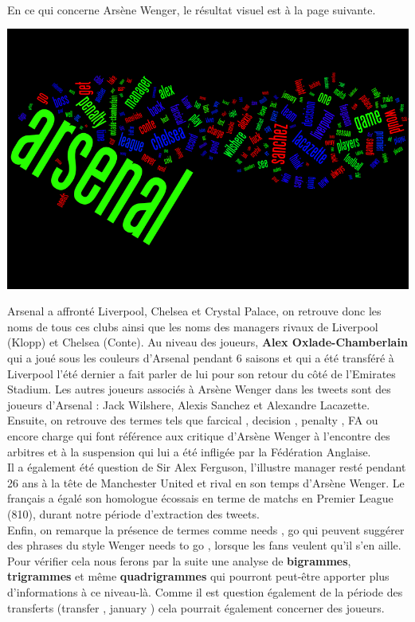 \documentclass[14pt, openany]{article}
\begin{document}
\paragraph{}
En ce qui concerne Arsène Wenger, le résultat visuel est à la page suivante.
\begin{center}
\includegraphics[scale=0.6]{Images/wenger_words.png}
\end{center}
Arsenal a affronté Liverpool, Chelsea et Crystal Palace, on retrouve donc les noms de tous ces clubs ainsi que les noms des managers rivaux de Liverpool (Klopp) et Chelsea (Conte). Au niveau des joueurs, \textbf{Alex Oxlade-Chamberlain} qui a joué sous les couleurs d'Arsenal pendant 6 saisons et qui a été transféré à Liverpool l'été dernier a fait parler de lui pour son retour du côté de l'Emirates Stadium. Les autres joueurs associés à Arsène Wenger dans les tweets sont des joueurs d'Arsenal : Jack Wilshere, Alexis Sanchez et Alexandre Lacazette.\\
Ensuite, on retrouve des termes tels que \og farcical \fg{}, \og decision \fg{}, \og penalty \fg{}, \og FA \fg{} ou encore \og charge \fg{}  qui font référence aux critique d'Arsène Wenger à l'encontre des arbitres et à la suspension qui lui a été infligée par la Fédération Anglaise.\\
Il a également été question de Sir Alex Ferguson, l'illustre manager resté pendant 26 ans à la tête de Manchester United et rival en son temps d'Arsène Wenger. Le français a égalé son homologue écossais en terme de matchs en Premier League (810), durant notre période d'extraction des tweets.\\
Enfin, on remarque la présence de termes comme \og needs \fg{}, \og go \fg{} qui peuvent suggérer des phrases du style \og Wenger needs to go \fg{}, lorsque les fans veulent qu'il s'en aille. Pour vérifier cela nous ferons par la suite une analyse de \textbf{bigrammes}, \textbf{trigrammes} et même \textbf{quadrigrammes} qui pourront peut-être apporter plus d'informations à ce niveau-là. Comme il est question également de la période des transferts (\og transfer \fg{}, \og january \fg{}) cela pourrait également concerner des joueurs.
\end{document}
